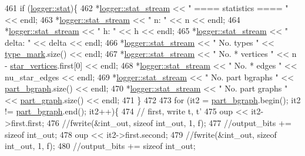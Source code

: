 \begin{DoxyCode}
461   \textcolor{keywordflow}{if} (\hyperlink{classlogger_a26812b5ba03f130e8dae3446d5fc032f}{logger::stat})\{
462     *\hyperlink{classlogger_a7db37821f875f2ba3540980b355779f5}{logger::stat\_stream} << \textcolor{stringliteral}{" ==== statistics ==== "} << endl;
463     *\hyperlink{classlogger_a7db37821f875f2ba3540980b355779f5}{logger::stat\_stream} << \textcolor{stringliteral}{" n:                "} << n << endl;
464     *\hyperlink{classlogger_a7db37821f875f2ba3540980b355779f5}{logger::stat\_stream} << \textcolor{stringliteral}{" h:                "} << h << endl;
465     *\hyperlink{classlogger_a7db37821f875f2ba3540980b355779f5}{logger::stat\_stream} << \textcolor{stringliteral}{" delta:            "} << delta << endl;
466     *\hyperlink{classlogger_a7db37821f875f2ba3540980b355779f5}{logger::stat\_stream} << \textcolor{stringliteral}{" No. types         "} << 
      \hyperlink{classmarked__graph__compressed_a86b00223525703e973415cbc9c94da68}{type\_mark}.size() << endl;
467     *\hyperlink{classlogger_a7db37821f875f2ba3540980b355779f5}{logger::stat\_stream} << \textcolor{stringliteral}{" No. * vertices    "} << n - 
      \hyperlink{classmarked__graph__compressed_a7a4ced4586e2e353f9076bd447df5208}{star\_vertices}.first[0] << endl;
468     *\hyperlink{classlogger_a7db37821f875f2ba3540980b355779f5}{logger::stat\_stream} << \textcolor{stringliteral}{" No. * edges       "} << nu\_star\_edges << endl;
469     *\hyperlink{classlogger_a7db37821f875f2ba3540980b355779f5}{logger::stat\_stream} << \textcolor{stringliteral}{" No. part bgraphs  "} << 
      \hyperlink{classmarked__graph__compressed_a7b3267063fba30b45eb21b3ba4e07536}{part\_bgraph}.size() << endl;
470     *\hyperlink{classlogger_a7db37821f875f2ba3540980b355779f5}{logger::stat\_stream} << \textcolor{stringliteral}{" No. part graphs   "} << 
      \hyperlink{classmarked__graph__compressed_ae179a4737e6eab905c18a94d44ef64b7}{part\_graph}.size() << endl;
471   \}
472 
473   \textcolor{keywordflow}{for} (it2 = \hyperlink{classmarked__graph__compressed_a7b3267063fba30b45eb21b3ba4e07536}{part\_bgraph}.begin(); it2 != \hyperlink{classmarked__graph__compressed_a7b3267063fba30b45eb21b3ba4e07536}{part\_bgraph}.end(); it2++)\{
474     \textcolor{comment}{// first, write t, t'}
475     oup << it2->first.first;
476     \textcolor{comment}{//fwrite(&int\_out, sizeof int\_out, 1, f);}
477     \textcolor{comment}{//output\_bits += sizeof int\_out;}
478     oup <<  it2->first.second;
479     \textcolor{comment}{//fwrite(&int\_out, sizeof int\_out, 1, f);}
480     \textcolor{comment}{//output\_bits += sizeof int\_out;}

\end{DoxyCode}
